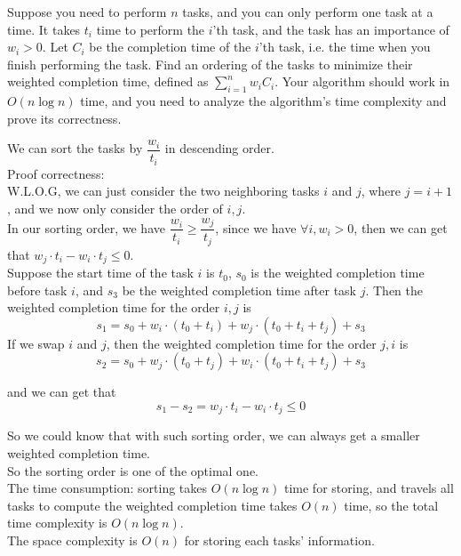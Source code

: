 \problem{}
Suppose you need to perform $n$ tasks, and you can only perform one task at a time.  It takes $t_i$ time to perform the $i$'th task, and the task has an importance of $w_i > 0$.  Let $C_i$ be the completion time of the $i$'th task, i.e. the time when you finish performing the task.  Find an ordering of the tasks to minimize their weighted completion time, defined as $\sum_{i=1}^{n} w_i  C_i$.  Your algorithm should work in $O(n\log{n})$ time, and you need to analyze the algorithm's time complexity and prove its correctness. 

\solution{}
We can sort the tasks by $\dfrac{w_i}{t_i}$ in descending order.\\

Proof correctness:\\
W.L.O.G, we can just consider the two neighboring tasks $i$ and $j$, where $j=i+1$, and we now only consider the order of $i,j$.\\
In our sorting order, we have $\dfrac{w_i}{t_i}\geq\dfrac{w_j}{t_j}$, since we have $\forall i,w_i>0$, then we can get that $ w_j\cdot t_i - w_i\cdot t_j \leq 0$.\\
Suppose the start time of the task $i$ is $t_0$, $s_0$ is the weighted completion time before task $i$, and $s_3$ be the weighted completion time after task $j$.
Then the weighted completion time for the order $i,j$ is
$$s_1=s_0+w_i\cdot(t_0+t_i)+w_j\cdot(t_0+t_i+t_j)+s_3$$
If we swap $i$ and $j$, then the weighted completion time for the order $j,i$ is
$$s_2=s_0+w_j\cdot(t_0+t_j)+w_i\cdot(t_0+t_i+t_j)+s_3$$

and we can get that
$$s_1-s_2 = w_j\cdot t_i - w_i\cdot t_j \leq 0$$

So we could know that with such sorting order, we can always get a smaller weighted completion time.\\
So the sorting order is one of the optimal one.\\

The time consumption: sorting takes $O(n\log n)$ time for storing, and travels all tasks to compute the weighted completion time takes $O(n)$ time,
so the total time complexity is $O(n\log n)$.\\
The space complexity is $O(n)$ for storing each tasks' information.\\

\newpage
